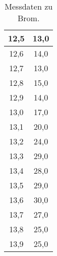 \begin{table}
    \centering
    \caption{Messdaten zu Brom.}
    \label{tab:Brom}
    \begin{tabular}{c c}
        \toprule
         12,5 &  13,0 \\
        \midrule
         12,6 &  14,0 \\
         12,7 &  13,0 \\
         12,8 &  15,0 \\
         12,9 &  14,0 \\
         13,0 &  17,0 \\
         13,1 &  20,0 \\
         13,2 &  24,0 \\
         13,3 &  29,0 \\
         13,4 &  28,0 \\
         13,5 &  29,0 \\
         13,6 &  30,0 \\
         13,7 &  27,0 \\
         13,8 &  25,0 \\
         13,9 &  25,0 \\
        \bottomrule
        \end{tabular}
\end{table}